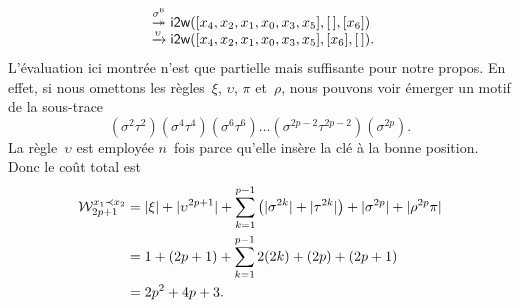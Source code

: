 \begin{itemize}
\begin{equation*}
\begin{array}{@{\!}r@{\;}c@{\;}l@{\!\!}}
        & \stackrel{\smash{\sigma^{\smash{6}}}}{\twoheadrightarrow}
        & \fun{i2w}([x_4,x_2,x_1,x_0,x_3,x_5],\el,[x_6])\\
        & \xrightarrow{\smash{\upsilon}}
        & \fun{i2w}([x_4,x_2,x_1,x_0,x_3,x_5],[x_6],\el).
      \end{array}
    \end{equation*}
    L'évaluation ici montrée n'est que partielle mais suffisante pour
    notre propos. En effet, si nous omettons les règles~\(\xi\),
    \(\upsilon\), \(\pi\) et~\(\rho\), nous pouvons voir émerger un
    motif de la sous-trace
    \begin{equation*}
    (\sigma^2\tau^2)(\sigma^4\tau^4)(\sigma^6\tau^6) \ldots
    (\sigma^{2p-2}\tau^{2p-2})(\sigma^{2p}).
    \end{equation*}
    La règle~\(\upsilon\) est employée \(n\)~fois parce qu'elle insère
    la clé à la bonne position. Donc le coût total est
    \begin{align*}
      \W{x_1 \prec x_2}{2p+1}
        &= \len{\xi} + \len{\upsilon^{2p+1}}
           + \sum_{k=1}^{p-1}{\left(\len{\sigma^{2k}} + \len{\tau^{2k}}\right)}
           + \len{\sigma^{2p}} + \len{\rho^{2p}\pi}\\
        &= 1 + (2p + 1) + \sum_{k=1}^{p-1}{2(2k)} + (2p) + (2p + 1)\\
        &= 2p^2 + 4p + 3.
    \end{align*}


\end{itemize}
